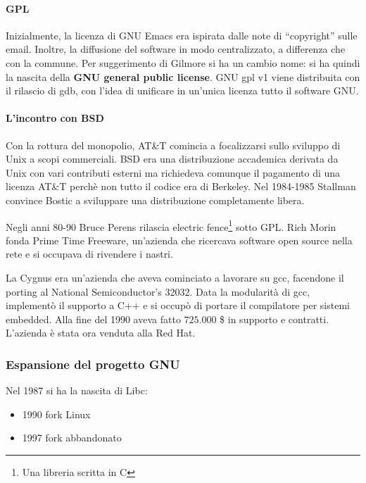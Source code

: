 \paragraph*{GPL} Inizialmente, la licenza di GNU Emacs era ispirata dalle note di ``copyright'' sulle email. Inoltre, la diffusione del software in modo centralizzato, a differenza che con la commune. Per suggerimento di Gilmore si ha un cambio nome: si ha quindi la nascita della \textbf{GNU general public license}. GNU gpl v1 viene distribuita con il rilascio di gdb, con l'idea di unificare in un'unica licenza tutto il software GNU.

\paragraph*{L'incontro con BSD} Con la rottura del monopolio, AT\&T comincia a focalizzarsi sullo sviluppo di Unix a scopi commerciali. BSD era una distribuzione accademica derivata da Unix con vari contributi esterni ma richiedeva comunque il pagamento di una licenza AT\&T perch\`e non tutto il codice era di Berkeley. Nel 1984-1985 Stallman convince Bostic a sviluppare una distribuzione completamente libera.

Negli anni 80-90 Bruce Perens rilascia electric fence\footnote{Una libreria scritta in C} sotto GPL. Rich Morin fonda Prime Time Freeware, un'azienda che ricercava software open source nella rete e si occupava di rivendere i nastri.

La Cygnus era un'azienda che aveva cominciato a lavorare su gcc, facendone il porting al National Semiconductor's 32032. Data la modularit\`a di gcc, implement\`o il supporto a C++ e si occup\`o di portare il compilatore per sistemi embedded. Alla fine del 1990 aveva fatto $725.000$ \$ in supporto e contratti. L'azienda \`e stata ora venduta alla Red Hat.

\subsubsection{Espansione del progetto GNU}

Nel 1987 si ha la nascita di Libc:
\begin{itemize}

\item 1990 fork Linux
\item 1997 fork abbandonato

\end{itemize}

